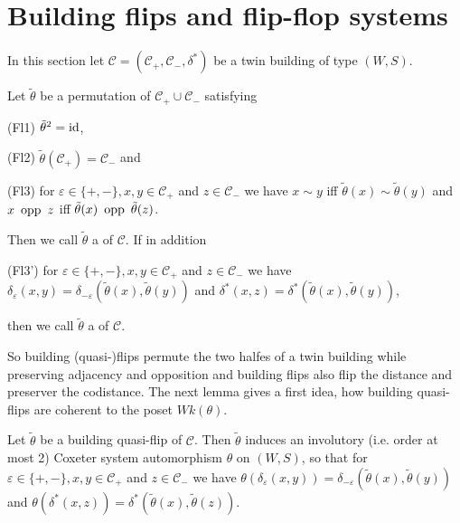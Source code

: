 \section{Building flips and flip-flop systems}
In this section let $\mathcal C = (\mathcal C_+, \mathcal C_-, \delta^*)$ be a twin building of type $(W,S)$.

\begin{defi}
	Let $\tilde \theta$ be a permutation of $\mathcal C_+ \cup \mathcal C_-$ satisfying
	\begin{axioms}
		\item[(Fl1)] \label{axiom:fl1} $\tilde \theta^2 = \operatorname{id}$,
		\item[(Fl2)] \label{axiom:fl2} $\tilde \theta(\mathcal C_+) = \mathcal C_-$ and
		\item[(Fl3)] \label{axiom:fl3} for $\varepsilon \in \{+,-\}, x,y \in \mathcal C_+$ and $z \in \mathcal C_-$ we have $x \sim y$ iff $\tilde \theta(x) \sim \tilde \theta(y)$ and $x \opp z$ iff $\tilde \theta(x) \opp \tilde \theta(z)$.
	\end{axioms}
	Then we call $\tilde \theta$ a  of $\mathcal{C}$. If in addition
	\begin{axioms}
		\item[(Fl3')] \label{axiom:fl3'} for $\varepsilon \in \{+,-\}, x,y \in \mathcal C_+$ and $z \in \mathcal C_-$ we have $\delta_\varepsilon(x,y) = \delta_{-\varepsilon}(\tilde \theta(x),\tilde \theta(y))$ and $\delta^*(x,z) = \delta^*(\tilde \theta(x),\tilde \theta(y))$, 
	\end{axioms}
	then we call $\tilde \theta$ a  of $\mathcal C$.
\end{defi}

So building (quasi-)flips permute the two halfes of a twin building while preserving adjacency and opposition and building flips also flip the distance and preserver the codistance. The next lemma gives a first idea, how building quasi-flips are coherent to the poset $Wk(\theta)$.

\begin{lemm}
	Let $\tilde \theta$ be a building quasi-flip of $\mathcal C$. Then $\tilde \theta$ induces an involutory (i.e. order at most 2) Coxeter system automorphism $\theta$ on $(W,S)$, so that for $\varepsilon \in \{+,-\}, x,y \in \mathcal C_+$ and $z \in \mathcal C_-$ we have $\theta(\delta_\varepsilon(x,y)) = \delta_{-\varepsilon}(\tilde \theta(x), \tilde \theta(y))$ and $\theta(\delta^*(x,z)) = \delta^*(\tilde \theta(x), \tilde \theta(z))$.
\end{lemm}

